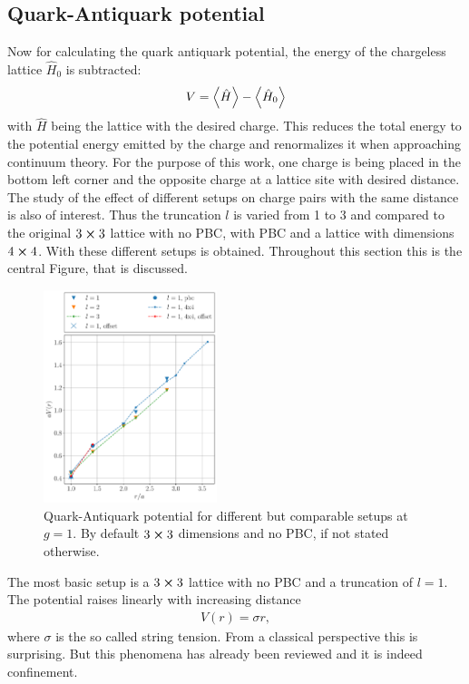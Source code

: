 \subsection{Quark-Antiquark potential}
Now for calculating the quark antiquark potential, the energy of the chargeless lattice $\hat{H}_{0}$ is subtracted:
\begin{align}
  V = \Braket{\hat{H}} - \Braket{\hat{H}_{0}}
\end{align}
with $\hat{H}$ being the lattice with the desired charge. This reduces the total energy to the potential energy emitted by the charge and renormalizes it when approaching continuum theory. %
For the purpose of this work, one charge is being placed in the bottom left corner and the opposite charge at a lattice site with desired distance.
The study of the effect of different setups on charge pairs with the same distance is also of interest. Thus the truncation $l$ is varied from 1 to 3 and compared to the original $3 \cross 3$ lattice with no PBC, with PBC and a lattice with dimensions $4\cross 4$. With these different setups  is obtained. Throughout this section this is the central Figure, that is discussed.
\begin{figure}[h]
	\begin{center}
		\includegraphics[width=0.45\textwidth]{images/quark_antiquark_potential_g_1.pdf}
	\end{center}
	\caption{Quark-Antiquark potential for different but comparable setups at $g=\num{1}$. By default $3\cross3$ dimensions and no PBC, if not stated otherwise.}\label{fig:qqbar}
\end{figure}

The most basic setup is a $3\cross 3$ lattice with no PBC and a truncation of $l=1$. The potential raises linearly with increasing distance
\begin{align}
	V(r) = \sigma r,
\end{align}
where $\sigma$ is the so called string tension.
From a classical perspective this is surprising. But this phenomena has already been reviewed \cite{RevModPhys.51.659} and it is indeed confinement.

